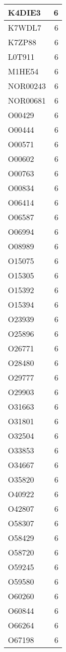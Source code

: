 \documentclass[
]{book}
\theoremstyle{definition}
\theoremstyle{definition}
\theoremstyle{definition}
\theoremstyle{definition}
\theoremstyle{remark}
\begin{document}
\begin{table}
\begin{tabular}{l|r}
\hline
K4DIE3 & 6\\
\hline
K7WDL7 & 6\\
\hline
K7ZP88 & 6\\
\hline
L0T911 & 6\\
\hline
M1HE54 & 6\\
\hline
NOR00243 & 6\\
\hline
NOR00681 & 6\\
\hline
O00429 & 6\\
\hline
O00444 & 6\\
\hline
O00571 & 6\\
\hline
O00602 & 6\\
\hline
O00763 & 6\\
\hline
O00834 & 6\\
\hline
O06414 & 6\\
\hline
O06587 & 6\\
\hline
O06994 & 6\\
\hline
O08989 & 6\\
\hline
O15075 & 6\\
\hline
O15305 & 6\\
\hline
O15392 & 6\\
\hline
O15394 & 6\\
\hline
O23939 & 6\\
\hline
O25896 & 6\\
\hline
O26771 & 6\\
\hline
O28480 & 6\\
\hline
O29777 & 6\\
\hline
O29903 & 6\\
\hline
O31663 & 6\\
\hline
O31801 & 6\\
\hline
O32504 & 6\\
\hline
O33853 & 6\\
\hline
O34667 & 6\\
\hline
O35820 & 6\\
\hline
O40922 & 6\\
\hline
O42807 & 6\\
\hline
O58307 & 6\\
\hline
O58429 & 6\\
\hline
O58720 & 6\\
\hline
O59245 & 6\\
\hline
O59580 & 6\\
\hline
O60260 & 6\\
\hline
O60844 & 6\\
\hline
O66264 & 6\\
\hline
O67198 & 6\\

\end{tabular}
\end{table}
\end{document}
